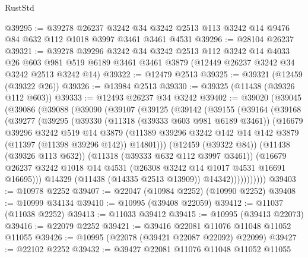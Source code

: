 \begin{lexlean}{RustStd}
\begin{coremodule}
@39295 := @39278
    @26237
    @3242
    @34
    @3242
    @2513
    @113
    @3242
    @14
    @9476
    @84
    @632
    @112
    @1018
    @3997
    @3461
    @3461
    @4531
@39296 := @28104 @26237
@39321 := @39278
    @39296
    @3242
    @34
    @3242
    @2513
    @112
    @3242
    @14
    @4033
    @26
    @603
    @981
    @519
    @6189
    @3461
    @3461
    @3879
    (@12449 @26237 @3242 @34 @3242 @2513 @3242 @14)
@39322 := @12479 @2513
@39325 := @39321 (@12459 (@39322 @26))
@39326 := @13984 @2513
@39330 := @39325 (@11438 (@39326 @112 @603))
@39333 := @12493 @26237 @34 @3242
@39402 := @39020
    (@39045
      (@39086
        (@39088
          (@39090
            (@39107
              (@39125
                (@39142
                  (@39155
                    (@39164
                      (@39168
                        (@39277
                          (@39295
                            (@39330
                              (@11318 (@39333 @603 @981 @6189 @3461))
                              (@16679
                                @39296
                                @3242
                                @519
                                @14
                                @3879
                                (@11389
                                  @39296
                                  @3242
                                  @142
                                  @14
                                  @142
                                  @3879
                                  (@11397 (@11398 @39296 @142))
                                  @14801)))
                            (@12459 (@39322 @84))
                            (@11438 (@39326 @113 @632))
                            (@11318 (@39333 @632 @112 @3997 @3461))
                            (@16679
                              @26237
                              @3242
                              @1018
                              @14
                              @4531
                              (@26308 @3242 @14 @1017 @4531 @16691 @16695)))
                          @14329
                          (@11438 (@14335 @2513 @13909))
                          @14342)))))))))))
@39403 := @10978 @2252
@39407 := @22047 (@10984 @2252) (@10990 @2252)
@39408 := @10999 @34134
@39410 := @10995 (@39408 @22059)
@39412 := @11037 (@11038 @2252)
@39413 := @11033 @39412
@39415 := @10995 (@39413 @22073)
@39416 := @22079 @2252
@39421 := @39416 @22081 @11076 @11048 @11052 @11055
@39426 := @10995 (@22078 (@39421 @22087 @22092) @22099)
@39427 := @22102 @2252
@39432 := @39427 @22081 @11076 @11048 @11052 @11055

\end{coremodule}
\end{lexlean}
